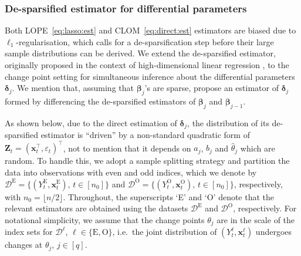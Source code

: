 \documentclass[11pt, a4paper]{article}
\newcommand{\mbf}{\mathbf}
\newcommand{\mc}{\mathcal}
\newcommand{\vep}{\varepsilon}
\def\wh{\widehat}
\newcommand{\cp}{\theta}
\newcommand{\tE}{\text{E}}
\newcommand{\tO}{\text{O}}
\theoremstyle{definition}
\theoremstyle{definition}
\theoremstyle{definition}
\theoremstyle{definition}
\theoremstyle{definition}
\theoremstyle{remark}
\theoremstyle{definition}
\theoremstyle{definition}
\theoremstyle{definition}
\begin{document}
\subsubsection{De-sparsified estimator for differential parameters}
\label{sec:debiased}

Both LOPE~\eqref{eq:lasso:est} and CLOM~\eqref{eq:direct:est} estimators are biased due to $\ell_1$-regularisation, which calls for a de-sparsification step before their large sample distributions can be derived.
We extend the de-sparsified estimator, originally proposed in the context of high-dimensional linear regression \citep{zhang2014confidence, javanmard2014confidence, van2014asymptotically}, to the change point setting for simultaneous inference about the differential parameters $\bm\delta_j$.
We mention that, assuming that $\bm\beta_j$'s are sparse, \cite{liu2024simultaneous} propose an estimator of $\bm\delta_j$ formed by differencing the de-sparsified estimators of $\bm\beta_j$ and $\bm\beta_{j - 1}$.

As shown below, due to the direct estimation of $\bm\delta_j$, the distribution of its de-sparsified estimator is ``driven'' by a non-standard quadratic form of $\mbf Z_t = (\mbf x_t^\top, \vep_t)^\top$, not to mention that it depends on $a_j$, $b_j$ and $\wh\cp_j$ which are random.
To handle this,
we adopt a sample splitting strategy and partition the data into observations with even and odd indices, which we denote by $\mc D^{\tE} = \{(Y_t^{\tE}, \mbf x_t^{\tE}), \, t \in [n_0]\}$ and $\mc D^{\tO} = \{(Y_t^{\tO}, \mbf x_t^{\tO}), \, t \in [n_0]\}$, respectively, with $n_0 = \lfloor n/2 \rfloor$.
Throughout, the superscripts `E' and `O' denote that the relevant estimators are obtained using the datasets $\mc D^{\tE}$ and $\mc D^{\tO}$, respectively.
For notational simplicity, we assume that the change points $\cp_j$ are in the scale of the index sets for $\mc D^{\ell}$, $\ell \in \{\tE, \tO\}$, i.e.\ the joint distribution of $(Y^\ell_t, \mbf x^\ell_t)$ undergoes changes at $\cp_j, \, j \in [q]$. 
\end{document}
